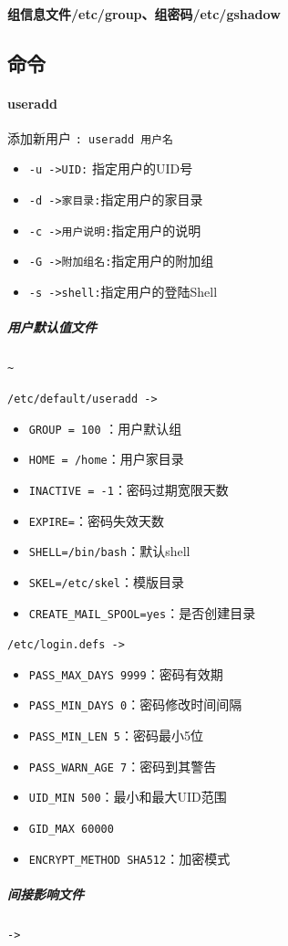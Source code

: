 \documentclass[UTF8,a4paper,12pt]{ctexbook}
\begin{document}
			\paragraph{组信息文件/etc/group、组密码/etc/gshadow}
			
			
		\subsection{命令}
			\paragraph{useradd} 添加新用户 \verb|: useradd 用户名|	
			
				\begin{itemize}[itemindent = 1em]
					\item \verb|-u ->UID:| 指定用户的UID号
					\item \verb|-d ->家目录:|指定用户的家目录
					\item \verb|-c ->用户说明:|指定用户的说明
					\item \verb|-G ->附加组名:|指定用户的附加组
					\item \verb|-s ->shell:|指定用户的登陆Shell
				\end{itemize}
			
					
				\subparagraph{用户默认值文件}\verb|~|
				
					\verb|/etc/default/useradd ->|
					
					\begin{itemize}[itemindent = 1em]
						\item \verb|GROUP = 100| ：用户默认组
						\item \verb|HOME = /home|：用户家目录
						\item \verb|INACTIVE = -1|：密码过期宽限天数
						\item \verb|EXPIRE=|：密码失效天数
						\item \verb|SHELL=/bin/bash|：默认shell
						\item \verb|SKEL=/etc/skel|：模版目录
						\item \verb|CREATE_MAIL_SPOOL=yes|：是否创建目录
					\end{itemize}	
					
					\verb|/etc/login.defs ->|
					
					\begin{itemize}[itemindent = 1em]
						\item \verb|PASS_MAX_DAYS 9999|：密码有效期
						\item \verb|PASS_MIN_DAYS 0|：密码修改时间间隔
						\item \verb|PASS_MIN_LEN 5|：密码最小5位
						\item \verb|PASS_WARN_AGE 7|：密码到其警告
						\item \verb|UID_MIN 500|：最小和最大UID范围
						\item \verb|GID_MAX 60000|
						\item \verb|ENCRYPT_METHOD SHA512|：加密模式 
					\end{itemize}
				\subparagraph{间接影响文件}
					\verb|->|
					
\end{document}
